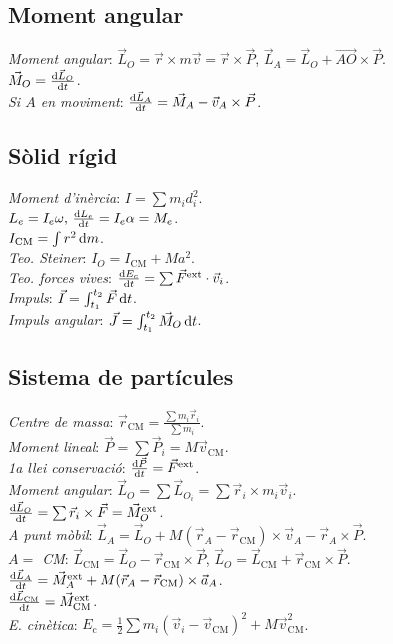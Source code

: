 \documentclass[10pt]{article}
\newcommand{\ci}{\textbullet\;}
\begin{document}
\begin{multicols}{3}
\subsection{Moment angular}
\emph{Moment angular}: $\vec{L}_O = \vec{r}\times m\vec{v} = \vec{r}\times\vec{P}$, $\vec{L}_A = \vec{L}_O + \vec{AO}\times\vec{P}$. \\
\ci $\vec{M}_O = \frac{\dif \vec{L}_O}{\dif t}$. \\
\emph{Si $A$ en moviment}: $\frac{\dif \vec{L}_A}{\dif t} = \vec{M}_A - \vec{v}_A\times\vec{P}$.

\subsection{Sòlid rígid}
\emph{Moment d'inèrcia}: $I = \sum m_i d_i^2$. \\
\ci $L_e = I_e\omega,\, \frac{\dif L_e}{\dif t} = I_e\alpha = M_e$. \\
\ci $I_{\text{CM}} = \int r^2 \dif m$. \\
\emph{Teo. Steiner}: $I_O = I_{\text{CM}} + Ma^2$. \\
\emph{Teo. forces vives}: $\frac{\dif E_c}{\dif t}  =\sum \vec{F}^{\text{ext}}\cdot\vec{v}_i$. \\
\emph{Impuls}: $\vec{I} = \int_{t_1}^{t_2} \vec{F}\dif t$. \\
\emph{Impuls angular}: $\vec{J} = \int_{t_1}^{t_2} \vec{M}_O\dif t$.

\subsection{Sistema de part\'icules}
\emph{Centre de massa}: $\vec{r}_{\text{CM}} = \frac{\sum m_i \vec{r}_i}{\sum m_i}$. \\
\emph{Moment lineal}: $\vec{P} = \sum \vec{P}_i = M\vec{v}_{\text{CM}}$. \\
\emph{1a llei conservaci\'o}: $\frac{\dif \vec{P}}{\dif t} = \vec{F}^{\text{ext}}$. \\
\emph{Moment angular}: $\vec{L}_O = \sum \vec{L}_{O_i} = \sum \vec{r}_i \times m_i\vec{v}_i$. \\
\ci $\frac{\dif \vec{L}_O}{\dif t} = \sum \vec{r}_i\times\vec{F} = \vec{M}_O^{\text{ext}}$. \\
\emph{A punt m\`obil}: $\vec{L}_A = \vec{L}_O + M(\vec{r}_A - \vec{r}_{\text{CM}}) \times \vec{v}_A - \vec{r}_A\times\vec{P}$. \\
\emph{$A =$ CM}: $\vec{L}_{\text{CM}} = \vec{L}_O - \vec{r}_{\text{CM}}\times\vec{P}$, $\vec{L}_O = \vec{L}_{\text{CM}} + \vec{r}_{\text{CM}}\times\vec{P}$. \\
\ci $\frac{\dif \vec{L}_A}{\dif t} = \vec{M}_A^{\text{ext}} + M(\vec{r}_A - \vec{r}_{\text{CM}})\times \vec{a}_A$. \\
\ci $\frac{\dif \vec{L}_{\text{CM}}}{\dif t} = \vec{M}_{\text{CM}}^{\text{ext}}$. \\
\emph{E. cin\`etica}: $E_{\text{c}} = \frac{1}{2} \sum m_i (\vec{v}_i - \vec{v}_{\text{CM}})^2 + M\vec{v}_{\text{CM}}^2$.


\end{multicols}
\end{document}
